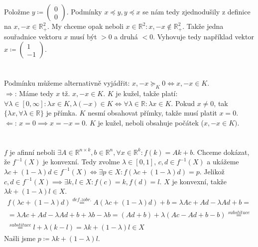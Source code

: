 \documentclass[12pt, a4paper]{article}
\begin{document}
\section{}
Položme $y \coloneqq \begin{pmatrix} 0 \\ 0\end{pmatrix}$. Podmínky $x \preceq y, y \preceq x$ se nám tedy zjednodušily z definice na $x,-x \in \mathbb{R}^2_+$. My chceme opak neboli $x \in \mathbb{R}^2: x,-x \not\in \mathbb{R}^2_+$. Takže jedna souřadnice vektoru $x$ musí být $> 0$ a druhá $< 0$. Vyhovuje tedy například vektor $x \coloneqq \begin{pmatrix} 1 \\ -1\end{pmatrix}$.

\section{}
Podmínku můžeme alternativně vyjádřit: $x,-x \succeq_K 0 \iff x,-x \in K$.\\
$\Rightarrow$: Máme tedy $x$ tž. $x,-x \in K$. $K$ je kužel, takže platí: \\$\forall \lambda \in [0,\infty]: \lambda x \in K, \lambda (-x) \in K \iff \forall \lambda \in \mathbb{R}: \lambda x \in K$. Pokud $x \neq 0$, tak $\{\lambda x, \forall \lambda \in \mathbb{R}\}$ je přímka. $K$ nesmí obsahovat přímky, takže musí platit $x=0$.\\
$\Leftarrow$: $x=0 \implies x=-x=0$. $K$ je kužel, neboli obsahuje počátek ($x,-x \in K)$.\\

\section{}
$f$ je afinní neboli $\exists A \in \mathbb{R}^{n \times k}, b \in \mathbb{R}^n, \forall x \in \mathbb{R}^k: f(k) = Ak+b$. Chceme dokázat, že $f^{-1}(X)$ je konvexní. Tedy zvolme $\lambda \in [0,1]$, $c,d \in f^{-1}(X)$ a ukážeme $\lambda c + (1-\lambda)d \in f^{-1}(X) \iff \exists p \in X: f(\lambda c + (1-\lambda)d)=p$. Jelikož $c,d \in f^{-1}(X) \implies \exists k,l \in X: f(c)=k, f(d)=l$. $X$ je konvexní, takže $\lambda k + (1-\lambda)l \in X$.
\begin{gather*}
f(\lambda c + (1-\lambda)d) \stackrel{def. zobr.}{=} A(\lambda c + (1-\lambda)d)+b = \lambda Ac + Ad - \lambda Ad + b = \\
= \lambda Ac + Ad - \lambda Ad + b + \lambda b - \lambda b = (Ad+b)+\lambda(Ac-Ad+b-b) \stackrel{substituce}{=} \\
\stackrel{substituce}{=} l + \lambda(k-l) = \lambda k + (1-\lambda)l \in X
\end{gather*}
Našli jsme $p \coloneqq \lambda k + (1-\lambda)l$.
\end{document}
